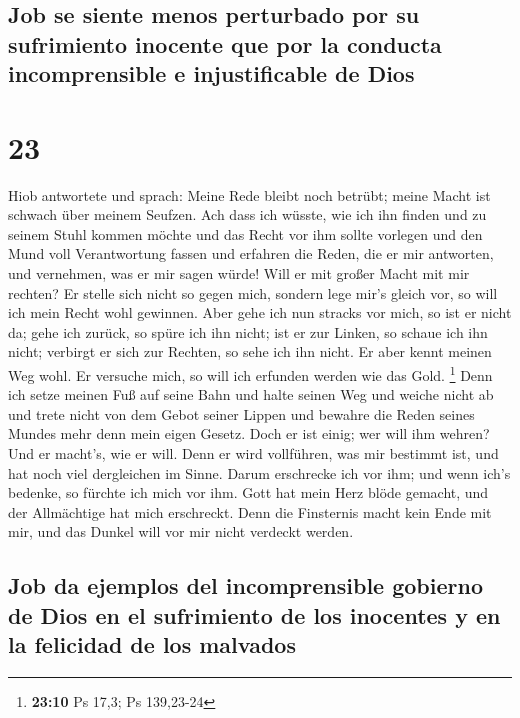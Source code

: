 \hypertarget{job-se-siente-menos-perturbado-por-su-sufrimiento-inocente-que-por-la-conducta-incomprensible-e-injustificable-de-dios}{%
\subsection{Job se siente menos perturbado por su sufrimiento inocente
que por la conducta incomprensible e injustificable de
Dios}\label{job-se-siente-menos-perturbado-por-su-sufrimiento-inocente-que-por-la-conducta-incomprensible-e-injustificable-de-dios}}

\hypertarget{section-22}{%
\section{23}\label{section-22}}

 Hiob antwortete und sprach:  Meine Rede
bleibt noch betrübt; meine Macht ist schwach über meinem Seufzen.
 Ach dass ich wüsste, wie ich ihn finden und zu seinem
Stuhl kommen möchte  und das Recht vor ihm sollte vorlegen
und den Mund voll Verantwortung fassen  und erfahren die
Reden, die er mir antworten, und vernehmen, was er mir sagen würde!
 Will er mit großer Macht mit mir rechten? Er stelle sich
nicht so gegen mich,  sondern lege mir's gleich vor, so
will ich mein Recht wohl gewinnen.  Aber gehe ich nun
stracks vor mich, so ist er nicht da; gehe ich zurück, so spüre ich ihn
nicht;  ist er zur Linken, so schaue ich ihn nicht;
verbirgt er sich zur Rechten, so sehe ich ihn nicht.  Er
aber kennt meinen Weg wohl. Er versuche mich, so will ich erfunden
werden wie das Gold. \footnote{\textbf{23:10} Ps 17,3; Ps 139,23-24}
 Denn ich setze meinen Fuß auf seine Bahn und halte
seinen Weg und weiche nicht ab  und trete nicht von dem
Gebot seiner Lippen und bewahre die Reden seines Mundes mehr denn mein
eigen Gesetz.  Doch er ist einig; wer will ihm wehren?
Und er macht's, wie er will.  Denn er wird vollführen,
was mir bestimmt ist, und hat noch viel dergleichen im Sinne.
 Darum erschrecke ich vor ihm; und wenn ich's bedenke, so
fürchte ich mich vor ihm.  Gott hat mein Herz blöde
gemacht, und der Allmächtige hat mich erschreckt.  Denn
die Finsternis macht kein Ende mit mir, und das Dunkel will vor mir
nicht verdeckt werden.

\hypertarget{job-da-ejemplos-del-incomprensible-gobierno-de-dios-en-el-sufrimiento-de-los-inocentes-y-en-la-felicidad-de-los-malvados}{%
\subsection{Job da ejemplos del incomprensible gobierno de Dios en el
sufrimiento de los inocentes y en la felicidad de los
malvados}\label{job-da-ejemplos-del-incomprensible-gobierno-de-dios-en-el-sufrimiento-de-los-inocentes-y-en-la-felicidad-de-los-malvados}}

